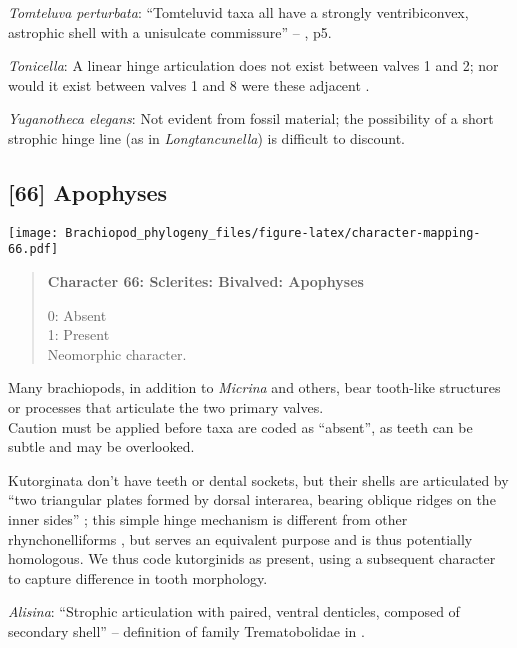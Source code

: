 \documentclass[openany]{book}
\theoremstyle{definition}
\theoremstyle{definition}
\theoremstyle{definition}
\theoremstyle{remark}
\begin{document}
\hypertarget{Tomteluva_perturbata-coding-65}{}
\emph{Tomteluva perturbata}: ``Tomteluvid taxa all have a strongly
ventribiconvex, astrophic shell with a unisulcate commissure'' --
\citet{Streng2016Anew}, p5.

\hypertarget{Tonicella-coding-65}{}
\emph{Tonicella}: A linear hinge articulation does not exist between
valves 1 and 2; nor would it exist between valves 1 and 8 were these
adjacent \citep{Connors2012}.

\hypertarget{Yuganotheca_elegans-coding-65}{}
\emph{Yuganotheca elegans}: Not evident from fossil material; the
possibility of a short strophic hinge line (as in \emph{Longtancunella})
is difficult to discount.

\subsection*{{[}66{]} Apophyses}\label{apophyses}

\texttt{[image: Brachiopod\_phylogeny\_files/figure-latex/character-mapping-66.pdf]}

\begin{quote}
\textbf{Character 66: Sclerites: Bivalved: Apophyses}

0: Absent\\
1: Present\\
Neomorphic character.
\end{quote}

Many brachiopods, in addition to \emph{Micrina} and others, bear
tooth-like structures or processes that articulate the two primary
valves.\\
Caution must be applied before taxa are coded as ``absent'', as teeth
can be subtle and may be overlooked.

Kutorginata don't have teeth or dental sockets, but their shells are
articulated by ``two triangular plates formed by dorsal interarea,
bearing oblique ridges on the inner sides''
\citep[p.~211]{Williams2000LinguliformeaCraniiformea}; this simple hinge
mechanism is different from other rhynchonelliforms
\citep[p.208]{Williams2000LinguliformeaCraniiformea}, but serves an
equivalent purpose and is thus potentially homologous. We thus code
kutorginids as present, using a subsequent character to capture
difference in tooth morphology.

\hypertarget{Alisina-coding-66}{}
\emph{Alisina}: ``Strophic articulation with paired, ventral denticles,
composed of secondary shell'' -- definition of family Trematobolidae in
\citet{Williams2000LinguliformeaCraniiformea}.
\end{document}
